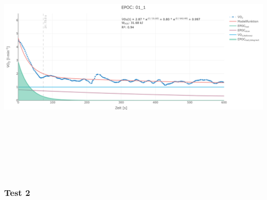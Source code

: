 \documentclass[
  letterpaper,
  DIV=11]{scrartcl}
\begin{document}
\includegraphics[width=11.45833in,height=4.6875in]{images/01_1.png}

\subsubsection{Test 2}
\end{document}
